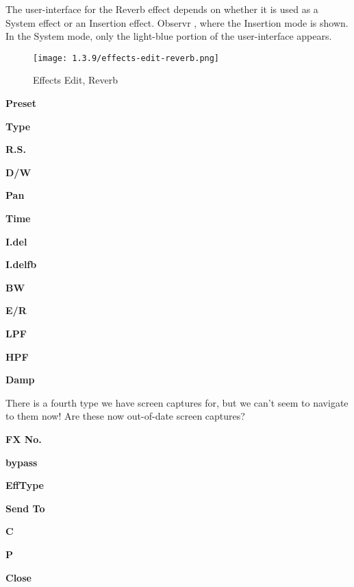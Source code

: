    The user-interface for the Reverb effect depends on whether it is used as a
   System effect or an Insertion effect.
   Observr , where
   the Insertion mode is shown.  In the System mode, only the light-blue
   portion of the user-interface appears.

\begin{figure}[H]
   \centering
   \texttt{[image: 1.3.9/effects-edit-reverb.png]}
   \caption{Effects Edit, Reverb}
   \label{fig:effects_edit_reverb}
\end{figure}

   \begin{enumber}
      \item \textbf{Preset}
      \item \textbf{Type}
      \item \textbf{R.S.}
      \item \textbf{D/W}
      \item \textbf{Pan}
      \item \textbf{Time}
      \item \textbf{I.del}
      \item \textbf{I.delfb}
      \item \textbf{BW}
      \item \textbf{E/R}
      \item \textbf{LPF}
      \item \textbf{HPF}
      \item \textbf{Damp}
   \end{enumber}

  There is a fourth type we have screen captures for, but we can't seem
  to navigate to them now!  Are these now out-of-date screen captures?

   \begin{enumber}
      \item \textbf{FX No.}
      \item \textbf{bypass}
      \item \textbf{EffType}
      \item \textbf{Send To}
      \item \textbf{C}
      \item \textbf{P}
      \item \textbf{Close}
   \end{enumber}

   \setcounter{ItemCounter}{0}      %

